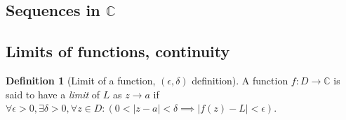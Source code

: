 \documentclass[hidelinks,12pt]{article}
\theoremstyle{definition}
\newtheorem{definition}{Definition}[section]
\newcommand{\modulus}[1]{\left|#1\right|} %
\begin{document}
  \subsection{Sequences in $\mathbb{C}$}
  \subsection{Limits of functions, continuity}
  \begin{definition}[Limit of a function, $(\epsilon, \delta)$ definition]
    \label{def:edlim}
    A function $f: D \to \mathbb{C}$ is said to have a \emph{limit} of $L$ as $z \to a$ if $\forall\epsilon > 0, \exists\delta > 0, \forall z \in D: (0 < \modulus{z-a} < \delta \implies \modulus{f(z)-L} < \epsilon)$.
  \end{definition}
\end{document}
